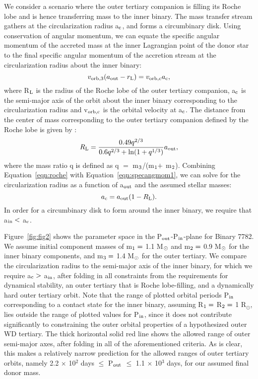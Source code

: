 \documentclass{aastex62}
\begin{document}
We consider a scenario where the outer tertiary companion is filling its Roche lobe and is hence transferring mass to the inner binary.  The mass transfer stream gathers at the circularization radius a$_{\rm c}$, and forms a circumbinary disk.  Using conservation of angular momentum, we can equate the specific angular momentum of the accreted mass at the inner Lagrangian point of the donor star to the final specific angular momentum of the accretion stream at the circularization radius about the inner binary:
\begin{equation}
\label{eqn:specangmom1}
v_{\rm orb,3}(a_{\rm out} - r_{\rm L}) = v_{\rm orb,c}a_{\rm c},
\end{equation}
where R$_{\rm L}$ is the radius of the Roche lobe of the outer tertiary companion, a$_{\rm c}$ is the semi-major axis of the orbit about the inner binary corresponding to the circularization radius and v$_{\rm orb,c}$ is the orbital velocity at a$_{\rm c}$.  The distance from the center of mass corresponding to the outer tertiary companion defined by the Roche lobe is given by \citep{eggleton83}: 
\begin{equation}
\label{eqn:roche}
R_{\rm L} = \frac{0.49q^{2/3}}{0.6q^{2/3} + {\rm ln}(1 + q^{1/3})}a_{\rm out},
\end{equation}
where the mass ratio q is defined as q $=$ m$_{\rm 3}$/(m$_{\rm 1} +$ m$_{\rm 2}$).  Combining Equation~\ref{eqn:roche} with Equation~\ref{eqn:specangmom1}, we can solve for the circularization radius as a function of a$_{\rm out}$ and the assumed stellar masses:
\begin{equation}
\label{eqn:ac}
a_{\rm c} = a_{\rm out}(1 - R_{\rm L}).
\end{equation}
In order for a circumbinary disk to form around the inner binary, we require that a$_{\rm in} <$ a$_{\rm c}$.

Figure~\ref{fig:fig2} shows the parameter space in the P$_{\rm out}$-P$_{\rm in}$-plane for Binary 7782.  We assume initial component masses of m$_{\rm 1} =$ 1.1 M$_{\rm \odot}$ and m$_{\rm 2} =$ 0.9 M$_{\rm \odot}$ for the inner binary components, and m$_{\rm 3} =$ 1.4 M$_{\rm \odot}$ for the outer tertiary.  We compare the circularization radius to the semi-major axis of the inner binary, for which we require a$_{\rm c} >$ a$_{\rm in}$, after folding in all constraints from the requirements for dynamical stability, an outer tertiary that is Roche lobe-filling, and a dynamically hard outer tertiary orbit.  Note that the range of plotted orbital periods P$_{\rm in}$ corresponding to a contact state for the inner binary, assuming R$_{\rm 1} =$ R$_{\rm 2} =$ 1 R$_{\odot}$, lies outside the range of plotted values for P$_{\rm in}$, since it does not contribute significantly to constraining the outer orbital properties of a hypothesized outer WD tertiary.  The thick horizontal solid red line shows the allowed range of outer semi-major axes, after folding in all of the aforementioned criteria.  As is clear, this makes a relatively narrow prediction for the allowed ranges of outer tertiary orbits, namely 2.2 $\times$ 10$^{2}$ days $\le$ P$_{\rm out}$ $\le$ 1.1 $\times$ 10$^3$ days, for our assumed final donor mass.  
\end{document}
